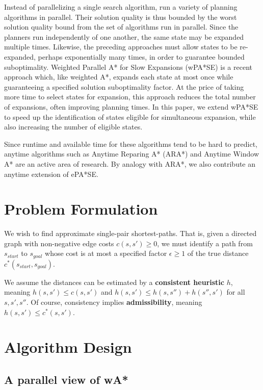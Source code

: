 \documentclass[letterpaper]{article}
\begin{document}
Instead of parallelizing a single search algorithm, \cite{valenzano10} run a variety of planning algorithms in parallel.
Their solution quality is thus bounded by the worst solution quality bound from the set of algorithms
run in parallel. Since the planners run independently of one another, the same state may be expanded multiple times.
Likewise, the preceding approaches must allow states to be re-expanded, perhaps exponentially many times, in order to guarantee bounded suboptimality. Weighted Parallel A* for Slow Expansions (wPA*SE) \cite{phillips2014pa}
is a recent approach which, like weighted A*, expands each state at most once
while guaranteeing a specified solution suboptimality factor. At the price of taking more time to select states for expansion, this approach reduces the total number of expansions, often improving planning times.
In this paper, we extend wPA*SE to speed up the identification of states eligible for simultaneous expansion, while also increasing the number of eligible states.

Since runtime and available time for these algorithms tend to be hard to predict, anytime algorithms such as Anytime Reparing A* (ARA*) \cite{likhachev2003ara} and Anytime Window A* \cite{aine2007awa} are an active area of research.
By analogy with ARA*, we also contribute an anytime extension of ePA*SE. 

\section{Problem Formulation}

We wish to find approximate single-pair shortest-paths. That is, given a directed graph with non-negative edge costs $c(s,s') \ge 0$, we must identify a path from $s_{start}$ to $s_{goal}$ whose cost is at most a specified factor $\epsilon\ge 1$ of the true distance $c^*(s_{start},s_{goal})$.

We assume the distances can be estimated by a \textbf{consistent heuristic} $h$, meaning $h(s,s')\le c(s,s')$ and $h(s,s')\le h(s,s'') + h(s'',s')$ for all $s,s',s''$. Of course, consistency implies \textbf{admissibility}, meaning $h(s,s')\le c^*(s,s')$.

\section{Algorithm Design}

\subsection{A parallel view of wA*}
\end{document}
